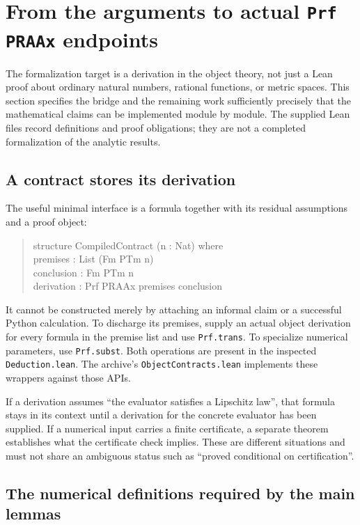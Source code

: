 \section{From the arguments to actual \texttt{Prf PRAAx} endpoints}\label{sec:formalization}

The formalization target is a derivation in the object theory, not just a
Lean proof about ordinary natural numbers, rational functions, or metric spaces.
This section specifies the bridge and the remaining work sufficiently precisely
that the mathematical claims can be implemented module by module. The supplied
Lean files record definitions and proof obligations; they are not a completed
formalization of the analytic results.

\subsection{A contract stores its derivation}

The useful minimal interface is a formula together with its residual assumptions
and a proof object:
\begin{quote}\ttfamily\small
structure CompiledContract (n : Nat) where\\
\hspace*{1em}premises : List (Fm PTm n)\\
\hspace*{1em}conclusion : Fm PTm n\\
\hspace*{1em}derivation : Prf PRAAx premises conclusion
\end{quote}
It cannot be constructed merely by attaching an informal claim or a successful
Python calculation. To discharge its premises, supply an actual object
derivation for every formula in the premise list and use \texttt{Prf.trans}.
To specialize numerical parameters, use \texttt{Prf.subst}. Both operations
are present in the inspected \texttt{Deduction.lean}. The archive's
\texttt{ObjectContracts.lean} implements these wrappers against those APIs.

If a derivation assumes ``the evaluator satisfies a Lipschitz law'', that
formula stays in its context until a derivation for the concrete evaluator
has been supplied. If a numerical input carries a finite certificate, a
separate theorem establishes what the certificate check implies. These are
different situations and must not share an ambiguous status such as ``proved
conditional on certification''.

\subsection{The numerical definitions required by the main lemmas}


